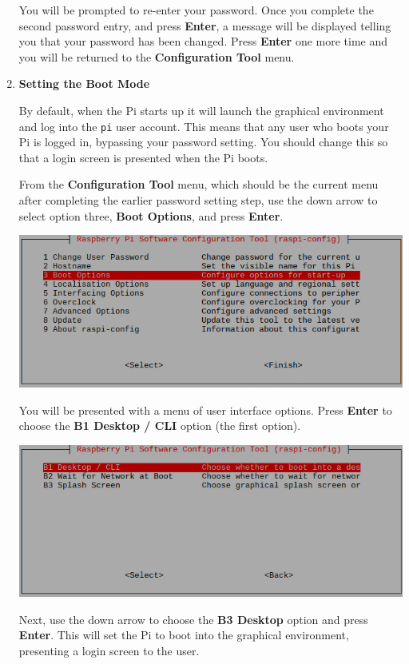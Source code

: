 \begin{enumerate}
You will be prompted to re-enter your password. Once you complete the second password entry, and press \textbf{Enter}, a message will be displayed telling you that your password has been changed. Press \textbf{Enter} one more time and you will be returned to the \textbf{Configuration Tool} menu.

\item \textbf{Setting the Boot Mode}

By default, when the Pi starts up it will launch the graphical environment and log into the \texttt{pi} user account. This means that any user who boots your Pi is logged in, bypassing your password setting. You should change this so that a login screen is presented when the Pi boots.


From the \textbf{Configuration Tool} menu, which should be the current menu after completing the earlier password setting step, use the down arrow to select option three, \textbf{Boot Options}, and press \textbf{Enter}.

\beforefig
\centerline{\includegraphics[height=1.5 in]{pi_images/setup/boot_options_choice.png}}
\afterfig

You will be presented with a menu of user interface options. Press \textbf{Enter} to choose the \textbf{B1 Desktop / CLI} option (the first option).

\beforefig
\centerline{\includegraphics[height=1.5 in]{pi_images/setup/desktop_cli_choice.png}}
\afterfig

\newpage 

Next, use the down arrow to choose the \textbf{B3 Desktop} option and press \textbf{Enter}. This will set the Pi to boot into the graphical environment, presenting a login screen to the user.


\end{enumerate}

